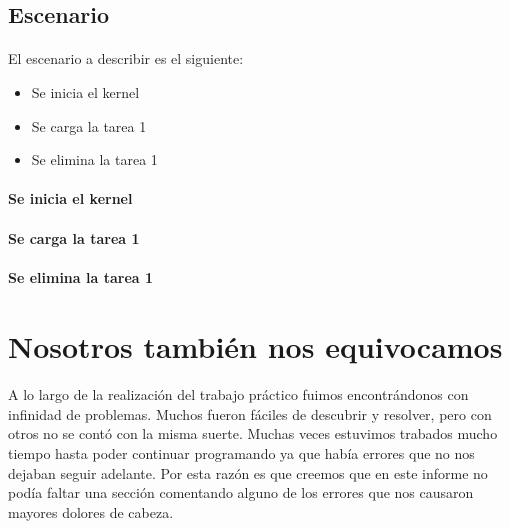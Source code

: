 \documentclass[11pt, a4paper]{article}
\begin{document}
\subsection{Escenario}
\paragraph{}
El escenario a describir es el siguiente:
\begin{itemize}
	\item Se inicia el kernel
	\item Se carga la tarea 1
	\item Se elimina la tarea 1
\end{itemize}

\paragraph{Se inicia el kernel}
\paragraph{Se carga la tarea 1}
\paragraph{Se elimina la tarea 1}


\section{Nosotros también nos equivocamos}

\paragraph{}
A lo largo de la realización del trabajo práctico fuimos encontrándonos con infinidad de problemas. Muchos fueron fáciles de descubrir y resolver, pero con otros no se contó con la misma suerte. Muchas veces estuvimos trabados mucho tiempo hasta poder continuar programando ya que había errores que no nos dejaban seguir adelante. Por esta razón es que creemos que en este informe no podía faltar una sección comentando alguno de los errores que nos causaron mayores dolores de cabeza.
\end{document}
